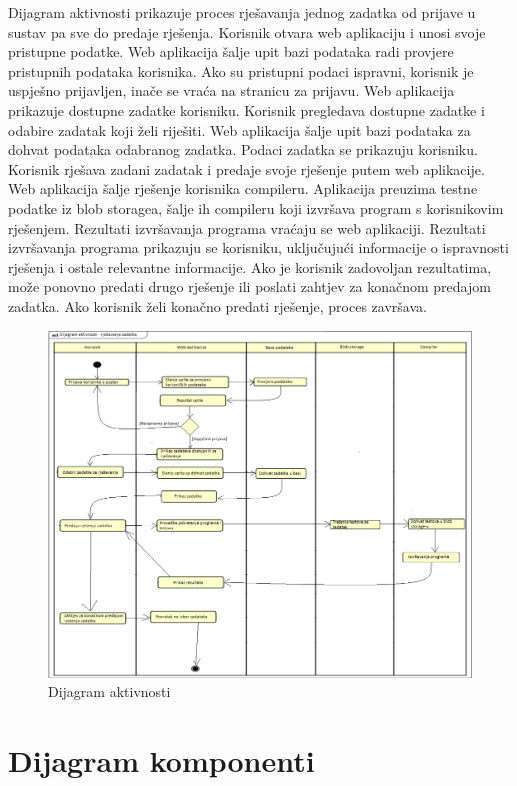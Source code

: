 			Dijagram aktivnosti prikazuje proces rješavanja jednog zadatka od prijave u sustav pa sve do predaje rješenja. Korisnik otvara web aplikaciju i unosi svoje pristupne podatke. Web aplikacija šalje upit bazi podataka radi provjere pristupnih podataka korisnika. Ako su pristupni podaci ispravni, korisnik je uspješno prijavljen, inače se vraća na stranicu za prijavu. Web aplikacija prikazuje dostupne zadatke korisniku. Korisnik pregledava dostupne zadatke i odabire zadatak koji želi riješiti. Web aplikacija šalje upit bazi podataka za dohvat podataka odabranog zadatka. Podaci zadatka se prikazuju korisniku. Korisnik rješava zadani zadatak i predaje svoje rješenje putem web aplikacije. Web aplikacija šalje rješenje korisnika compileru. Aplikacija preuzima testne podatke iz blob storagea, šalje ih compileru koji izvršava program s korisnikovim rješenjem. Rezultati izvršavanja programa vraćaju se web aplikaciji. Rezultati izvršavanja programa prikazuju se korisniku, uključujući informacije o ispravnosti rješenja i ostale relevantne informacije. Ako je korisnik zadovoljan rezultatima, može ponovno predati drugo rješenje ili poslati zahtjev za konačnom predajom zadatka. Ako korisnik želi konačno predati rješenje, proces završava.
			\eject
			
			\begin{figure}[H]
				\includegraphics[width=\linewidth]{slike/DijagramAktivnosti.png}
				\centering
				\caption{Dijagram aktivnosti}
				\label{fig:aktivnost}
			\end{figure}
			\eject
		\section{Dijagram komponenti}
		
